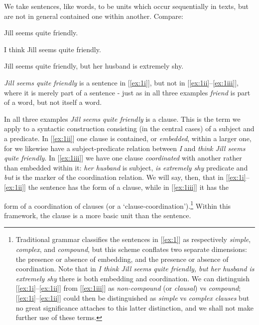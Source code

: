 We take sentences, like words, to be units which occur sequentially in texts, but are not in general contained one within another. Compare:

\begin{examples}
    \item \label{ex:1}
    \begin{examples}
        \item \label{ex:1i} Jill seems quite friendly.
        \item \label{ex:1ii} I think Jill seems quite friendly.
        \item \label{ex:1iii} Jill seems quite friendly, but her husband is extremely shy.
    \end{examples}
\end{examples}
{\textit{Jill seems quite friendly} is a sentence in [\ref{ex:1i}], but not in [\ref{ex:1ii}--\ref{ex:1iii}], where it is merely part of a sentence - just as in all three examples \textit{friend} is part of a word, but not itself a word.}

{In all three examples \textit{Jill seems quite friendly} is a {clause}. This is the term we apply to a syntactic construction consisting (in the central cases) of a subject and a predicate. In} [\ref{ex:1ii}] one clause is contained, or \textit{embedded}, within a larger one, for we likewise have a subject-predicate relation between \textit{I} and \textit{think Jill seems quite friendly}. In [\ref{ex:1iii}] we have one clause \textit{coordinated} with another rather than embedded within it: \textit{her husband} is subject, \textit{is extremely shy} predicate and \textit{but} is the marker of the coordination relation. {We will say, then, that in [\ref{ex:1i}--\ref{ex:1ii}] the sentence has the form of a clause, while in [\ref{ex:1iii}] it has the}


\newpage
\noindent form of a coordination of clauses (or a `clause-coordination').\footnote{Traditional grammar classifies the sentences in [\ref{ex:1}] as respectively \textit{simple}, \textit{complex}, and \textit{compound}, but this scheme conflates two separate dimensions: the presence or absence of embedding, and the presence or absence of coordination. Note that in \textit{I think Jill seems quite friendly, but her husband is extremely shy} there is both embedding and coordination. We can distinguish [\ref{ex:1i}--\ref{ex:1ii}] from [\ref{ex:1iii}] as \textit{non-compound} (or \textit{clausal}) vs \textit{compound}; [\ref{ex:1i}--\ref{ex:1ii}] could then be distinguished as \textit{simple} vs \textit{complex clauses} but no great significance attaches to this latter distinction, and we shall not make further use of these terms.} Within this framework, the clause is a more basic unit than the sentence.

